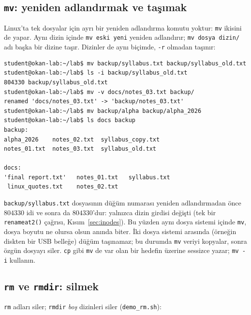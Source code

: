 \documentclass[11pt,a4paper]{article}
\newcommand{\cmd}[1]{\texttt{#1}}
\begin{document}
\subsection{\texttt{mv}: yeniden adlandırmak ve taşımak}

Linux'ta tek dosyalar için ayrı bir yeniden adlandırma komutu yoktur: \cmd{mv} ikisini de yapar. Aynı dizin içinde \cmd{mv eski yeni} yeniden adlandırır; \cmd{mv dosya dizin/} adı başka bir dizine taşır. Dizinler de aynı biçimde, \cmd{-r} olmadan taşınır:

\begin{lstlisting}[style=term]
student@okan-lab:~/lab$ mv backup/syllabus.txt backup/syllabus_old.txt
student@okan-lab:~/lab$ ls -i backup/syllabus_old.txt
804330 backup/syllabus_old.txt
student@okan-lab:~/lab$ mv -v docs/notes_03.txt backup/
renamed 'docs/notes_03.txt' -> 'backup/notes_03.txt'
student@okan-lab:~/lab$ mv backup/alpha backup/alpha_2026
student@okan-lab:~/lab$ ls docs backup
backup:
alpha_2026    notes_02.txt  syllabus_copy.txt
notes_01.txt  notes_03.txt  syllabus_old.txt

docs:
'final report.txt'   notes_01.txt   syllabus.txt
 linux_quotes.txt    notes_02.txt
\end{lstlisting}

\texttt{backup/syllabus.txt} dosyasının düğüm numarası yeniden adlandırmadan önce $804330$ idi ve sonra da $804330$'dur: yalnızca dizin girdisi değişti (tek bir \cmd{renameat2()} çağrısı, Kısım~\ref{sec:inodes}). Bu yüzden aynı dosya sistemi içinde \cmd{mv}, dosya boyutu ne olursa olsun anında biter. İki dosya sistemi arasında (örneğin diskten bir USB belleğe) düğüm taşınamaz; bu durumda \cmd{mv} veriyi kopyalar, sonra özgün dosyayı siler. \cmd{cp} gibi \cmd{mv} de var olan bir hedefin üzerine sessizce yazar; \cmd{mv -i} kullanın.

\subsection{\texttt{rm} ve \texttt{rmdir}: silmek}

\cmd{rm} adları siler; \cmd{rmdir} \emph{boş} dizinleri siler (\cmd{demo\_rm.sh}):
\end{document}
